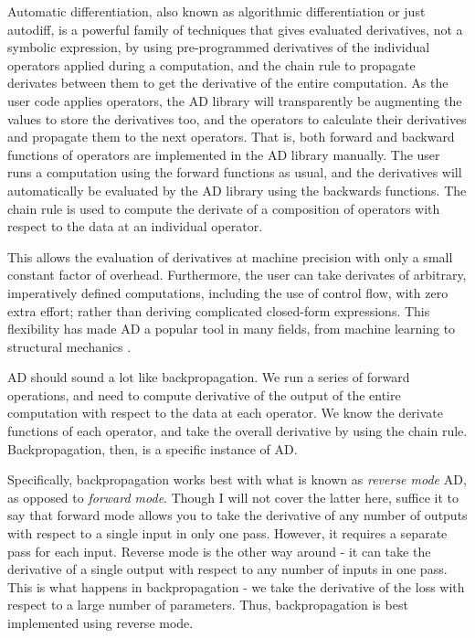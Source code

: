 Automatic differentiation, also known as algorithmic differentiation or just autodiff,
is a powerful family of techniques that gives evaluated derivatives, not a symbolic expression, by using pre-programmed derivatives of the individual operators applied during a computation, and the chain rule to propagate derivates between them to get the derivative of the entire computation.
As the user code applies operators, the AD library will transparently be augmenting the values to store the derivatives too, and the operators to calculate their derivatives and propagate them to the next operators.
That is, both forward and backward functions of operators are implemented in the AD library manually.
The user runs a computation using the forward functions as usual, and the derivatives will automatically be evaluated by the AD library using the backwards functions.
The chain rule is used to compute the derivate of a composition of operators with respect to the data at an individual operator.

This allows the evaluation of derivatives at machine precision with only a small constant factor of overhead.
Furthermore, the user can take derivates of arbitrary, imperatively defined computations, including the use of control flow, with zero extra effort; rather than deriving complicated closed-form expressions.
This flexibility has made AD a popular tool in many fields, from machine learning to structural mechanics \cite{Haase2002}.

AD should sound a lot like backpropagation.
We run a series of forward operations, and need to compute derivative of the output of the entire computation with respect to the data at each operator. We know the derivate functions of each operator, and take the overall derivative by using the chain rule. Backpropagation, then, is a specific instance of AD.

Specifically, backpropagation works best with what is known as \textit{reverse mode} AD, as opposed to \textit{forward mode}.
Though I will not cover the latter here, suffice it to say that forward mode allows you to take the derivative of any number of outputs with respect to a single input in only one pass.
However, it requires a separate pass for each input.
Reverse mode is the other way around -
it can take the derivative of a single output with respect to any number of inputs in one pass.
This is what happens in backpropagation -
we take the derivative of the loss with respect to a large number of parameters.
Thus, backpropagation is best implemented using reverse mode.

